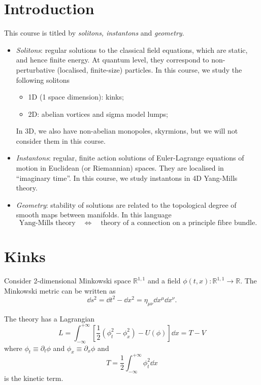 \documentclass[a4paper,11pt]{article}
\begin{document}
    \maketitlepage
    \tableofcontents
    \newpage
    \section*{Introduction}
     This course is titled by \emph{solitons, instantons} and \emph{geometry}. 
    \begin{itemize}
        \item \emph{Solitons}: regular solutions to the classical field equations, which are static, and hence finite energy. At quantum level, they correspond to non-perturbative (localised, finite-size) particles. In this course, we study the following solitons \begin{itemize}
            \item 1D (1 space dimension): kinks;
            \item 2D: abelian vortices and sigma model lumps;
        \end{itemize}
        In 3D, we also have non-abelian monopoles, skyrmions, but we will not consider them in this course.
        \item \emph{Instantons}: regular, finite action solutions of Euler-Lagrange equations of motion in Euclidean (or Riemannian) spaces. They are localised in ``imaginary time''. In this course, we study instantons in 4D Yang-Mills theory.
        \item \emph{Geometry}: stability of solutions are related to the topological degree of smooth maps between manifolds. In this language 
        \[
            \text{Yang-Mills theory} \quad \Longleftrightarrow \quad \text{theory of a connection on a principle fibre bundle}.
        \]
        
    \end{itemize}
    \newpage

    \section{Kinks}
    Consider 2-dimensional Minkowski space $\mathbb{R}^{1,1}$ and a field $\phi(t,x) : \mathbb{R}^{1,1} \to \mathbb{R}$. The Minkowski metric can be written as 
    \begin{equation}
        \dd{s^2} = \dd{t^2} - \dd{x^2} = \eta_{\mu \nu} \dd{x^\mu} \dd{x^\nu}.
    \end{equation}
    
    The theory has a Lagrangian 
    \begin{equation}
        L = \int_{-\infty}^{+\infty} \left[ \frac{1}{2} \left( \phi_t^2 - \phi_x^2 \right) - U(\phi) \right] \dd{x} = T - V\label{eq:2d-L}
    \end{equation}
    where $\phi_t \equiv \partial_t \phi$ and $\phi_x \equiv \partial_x \phi$ and 
    \begin{equation}
        T = \frac{1}{2} \int_{-\infty}^{+\infty} \phi_t^2 \dd{x}
    \end{equation}
    is the kinetic term.
\end{document}
